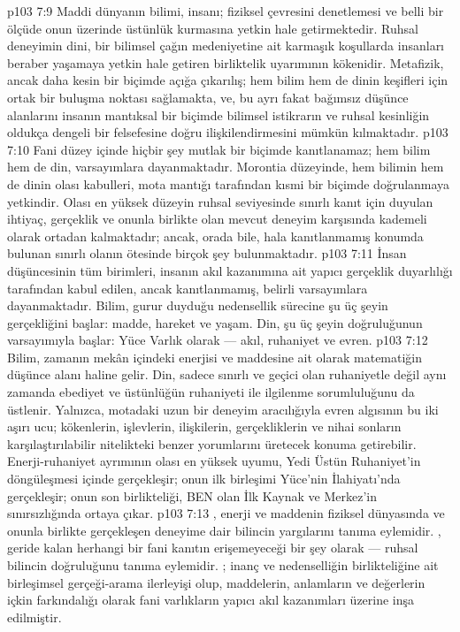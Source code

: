 \vs p103 7:9 Maddi dünyanın bilimi, insanı; fiziksel çevresini denetlemesi ve belli bir ölçüde onun üzerinde üstünlük kurmasına yetkin hale getirmektedir. Ruhsal deneyimin dini, bir bilimsel çağın medeniyetine ait karmaşık koşullarda insanları beraber yaşamaya yetkin hale getiren birliktelik uyarımının kökenidir. Metafizik, ancak daha kesin bir biçimde açığa çıkarılış; hem bilim hem de dinin keşifleri için ortak bir buluşma noktası sağlamakta, ve, bu ayrı fakat bağımsız düşünce alanlarını insanın mantıksal bir biçimde bilimsel istikrarın ve ruhsal kesinliğin oldukça dengeli bir felsefesine doğru ilişkilendirmesini mümkün kılmaktadır.
\vs p103 7:10 Fani düzey içinde hiçbir şey mutlak bir biçimde kanıtlanamaz; hem bilim hem de din, varsayımlara dayanmaktadır. Morontia düzeyinde, hem bilimin hem de dinin olası kabulleri, mota mantığı tarafından kısmi bir biçimde doğrulanmaya yetkindir. Olası en yüksek düzeyin ruhsal seviyesinde sınırlı kanıt için duyulan ihtiyaç, gerçeklik ve onunla birlikte olan mevcut deneyim karşısında kademeli olarak ortadan kalmaktadır; ancak, orada bile, hala kanıtlanmamış konumda bulunan sınırlı olanın ötesinde birçok şey bulunmaktadır.
\vs p103 7:11 İnsan düşüncesinin tüm birimleri, insanın akıl kazanımına ait yapıcı gerçeklik duyarlılığı tarafından kabul edilen, ancak kanıtlanmamış, belirli varsayımlara dayanmaktadır. Bilim, gurur duyduğu nedensellik sürecine şu üç şeyin gerçekliğini  başlar: madde, hareket ve yaşam. Din, şu üç şeyin doğruluğunun varsayımıyla başlar: Yüce Varlık olarak --- akıl, ruhaniyet ve evren.
\vs p103 7:12 Bilim, zamanın mekân içindeki enerjisi ve maddesine ait olarak matematiğin düşünce alanı haline gelir. Din, sadece sınırlı ve geçici olan ruhaniyetle değil aynı zamanda ebediyet ve üstünlüğün ruhaniyeti ile ilgilenme sorumluluğunu da üstlenir. Yalnızca, motadaki uzun bir deneyim aracılığıyla evren algısının bu iki aşırı ucu; kökenlerin, işlevlerin, ilişkilerin, gerçekliklerin ve nihai sonların karşılaştırılabilir nitelikteki benzer yorumlarını üretecek konuma getirebilir. Enerji\hyp{}ruhaniyet ayrımının olası en yüksek uyumu, Yedi Üstün Ruhaniyet’in döngüleşmesi içinde gerçekleşir; onun ilk birleşimi Yüce’nin İlahiyatı’nda gerçekleşir; onun son birlikteliği, BEN olan İlk Kaynak ve Merkez’in sınırsızlığında ortaya çıkar.
\vs p103 7:13 , enerji ve maddenin fiziksel dünyasında ve onunla birlikte gerçekleşen deneyime dair bilincin yargılarını tanıma eylemidir. , geride kalan herhangi bir fani kanıtın erişemeyeceği bir şey olarak --- ruhsal bilincin doğruluğunu tanıma eylemidir. ; inanç ve nedenselliğin birlikteliğine ait birleşimsel gerçeği\hyp{}arama ilerleyişi olup, maddelerin, anlamların ve değerlerin içkin farkındalığı olarak fani varlıkların yapıcı akıl kazanımları üzerine inşa edilmiştir.
